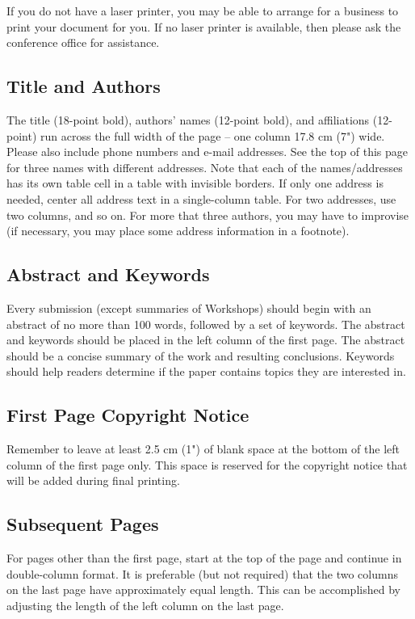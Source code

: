 If you do not have a laser printer, you may be able to arrange 
for a business to print your document for you. If no laser 
printer is available, then please ask the conference office for 
assistance. 

\subsection{Title and Authors}
The title (18-point bold), authors' names (12-point bold), 
and affiliations (12-point) run across the full width of the 
page -- one column 17.8 cm (7") wide. Please also include 
phone numbers and e-mail addresses. See the top of this 
page for three names with different addresses. Note that each 
of the names/addresses has its own table cell in a table with 
invisible borders. If only one address is needed, center all 
address text in a single-column table. For two addresses, use 
two columns, and so on. For more that three authors, you 
may have to improvise (if necessary, you may place some 
address information in a footnote). 

\subsection{Abstract and Keywords}
Every submission (except summaries of Workshops) should 
begin with an abstract of no more than 100 words, followed 
by a set of keywords. The abstract and keywords should be 
placed in the left column of the first page. The abstract 
should be a concise summary of the work and resulting 
conclusions. Keywords should help readers determine if the 
paper contains topics they are interested in.

\subsection{First Page Copyright Notice}
Remember to leave at least 2.5 cm (1") of blank space at the 
bottom of the left column of the first page only. This space is 
reserved for the copyright notice that will be added during 
final printing.

\subsection{Subsequent Pages}
For pages other than the first page, start at the top of the page 
and continue in double-column format. It is preferable (but 
not required) that the two columns on the last page have 
approximately equal length. This can be accomplished by 
adjusting the length of the left column on the last page.

